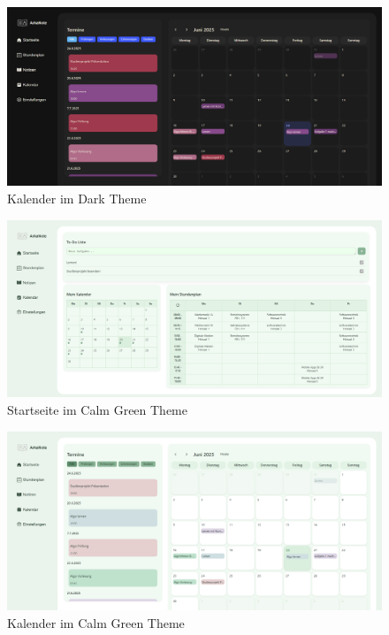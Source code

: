 \begin{figure}[H]
  \centering
  \includegraphics[width=1\textwidth]{./images/kalender-dark.png}
  \caption{Kalender im Dark Theme}
  \label{fig:kalender-dark}
\end{figure}

\begin{figure}[H]
  \centering
  \includegraphics[width=1\textwidth]{./images/startseite-green.png}
  \caption{Startseite im Calm Green Theme}
  \label{fig:startseite-green}
\end{figure}

\begin{figure}[H]
  \centering
  \includegraphics[width=1\textwidth]{./images/kalender-green.png}
  \caption{Kalender im Calm Green Theme}
  \label{fig:kalender-green}
\end{figure}

